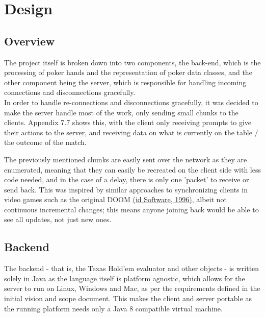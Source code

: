 \documentclass[11pt]{article}
\begin{document}



\newpage
\section{Design}

\subsection{Overview}

The project itself is broken down into two components, the back-end, which is the processing of poker hands and the representation of poker data classes, and the other component being the server, which is responsible for handling incoming connections and disconnections gracefully.  \\

In order to handle re-connections and disconnections gracefully, it was decided to make the server handle most of the work, only sending small chunks to the clients. Appendix 7.7 shows this, with the client only receiving prompts to give their actions to the server, and receiving data on what is currently on the table / the outcome of the match. 

The previously mentioned chunks are easily sent over the network as they are enumerated, meaning that they can easily be recreated on the client side with less code needed, and in the case of a delay, there is only one 'packet' to receive or send back. This was inspired by similar approaches to synchronizing clients in video games such as the original DOOM \hyperlink{doom_network}{(id Software, 1996)}, albeit not continuous incremental changes; this means anyone joining back would be able to see all updates, not just new ones. 


\subsection{Backend}

The backend - that is, the Texas Hold'em evaluator and other objects - is written solely in Java as the language itself is platform agnostic, which allows for the server to run on Linux, Windows and Mac, as per the requirements defined in the initial vision and scope document. This makes the client and server portable as the running platform needs only a Java 8 compatible virtual machine. 
\end{document}
